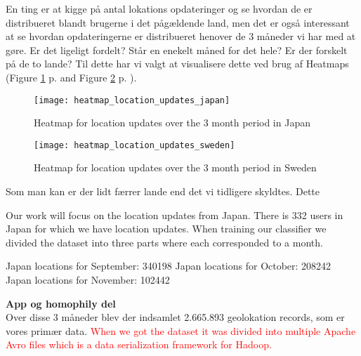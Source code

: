 En ting er at kigge på antal lokations opdateringer og se hvordan de er distribueret blandt brugerne i det pågældende land, men det er også interessant at se hvordan opdateringerne er distribueret henover de 3 måneder vi har med at gøre. Er det ligeligt fordelt? Står en enekelt måned for det hele? Er der forskelt på de to lande? Til dette har vi valgt at visualisere dette ved brug af Heatmaps (Figure \ref{fig:heatmap_jap} p.  \pageref{fig:heatmap_jap} and Figure \ref{fig:heatmap_swe} p. \pageref{fig:heatmap_swe}). 
\begin{figure}[H]
    \centering
    \texttt{[image: heatmap\_location\_updates\_japan]}
    \caption{Heatmap for location updates over the 3 month period in Japan}
    \label{fig:heatmap_jap}
\end{figure}


\begin{figure}[H]
    \centering
    \texttt{[image: heatmap\_location\_updates\_sweden]}
    \caption{Heatmap for location updates over the 3 month period in Sweden}
    \label{fig:heatmap_swe}
\end{figure}



Som man kan er der lidt færrer lande end det vi tidligere skyldtes. Dette 

Our work will focus on the location updates from Japan. There is 332 users in Japan for which we have location updates.
When training our classifier we divided the dataset into three parts where each corresponded to a month.

Japan locations for September: 340198
Japan locations for October: 208242
Japan locations for November: 102442

\textbf{App og homophily del}\\


Over disse 3 måneder blev der indsamlet 2.665.893 geolokation records, som er vores primær data. 
\textcolor{red}{When we got the dataset it was divided into multiple Apache Avro files which is a data serialization framework for Hadoop.\cite{apacheavro}}

